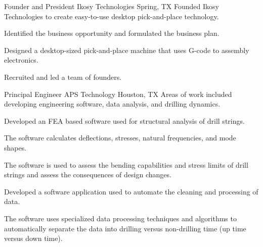 \documentclass{leresume}
\begin{document}
            {Founder and President}
            {Ikosy Technologies}
			{Spring, TX}
			Founded Ikosy Technologies to create easy-to-use desktop pick-and-place technology.
		\begin{bulletedlist}
			
		\item
		
				Identified the business opportunity and formulated the business plan.
			
		\item
		
				Designed a desktop-sized pick-and-place machine that uses G-code to assembly electronics.
			
		\item
		
				Recruited and led a team of founders.
			
		\end{bulletedlist}
	
            {Principal Engineer}
            {APS Technology}
			{Houston, TX}
			Areas of work included developing engineering software, data analysis, and drilling dynamics.\nolinebreak[4]
		\begin{bulletedlist}
			
		\item
		
				Developed an FEA based software used for structural analysis of drill strings.
			
		\begin{bulletedlist}
			
		\item
		
					The software calculates deflections, stresses, natural frequencies, and mode shapes.
				
		\item
		
					The software is used to assess the bending capabilities and stress limits of drill strings and assess the consequences of design changes.
				
		\end{bulletedlist}
	
		\item
		
				Developed a software application used to automate the cleaning and processing of data.
			
		\begin{bulletedlist}
			
		\item
		
					The software uses specialized data processing techniques and algorithms to automatically separate the data into drilling versus non-drilling time (up time versus down time).
				
		\end{bulletedlist}
	
		\end{bulletedlist}
	
\end{document}
